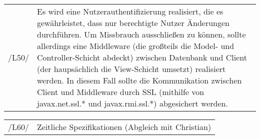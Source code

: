 \begin{tabular}{p{1.5cm}p{14.5cm}}
					
	 /L50/	& Es wird eine Nutzerauthentifizierung realisiert, die es gewährleistet, dass nur berechtigte Nutzer Änderungen durchführen. Um Missbrauch ausschließen zu können, sollte allerdings eine Middleware (die großteils die Model- und Controller-Schicht abdeckt) zwischen Datenbank und Client (der haupsächlich die View-Schicht umsetzt) realisiert werden. In diesem Fall sollte die Kommunikation zwischen Client und Middleware durch SSL (mithilfe von javax.net.ssl.* und javax.rmi.ssl.*) abgesichert werden. \\[0.25cm]
	
\end{tabular}


\begin{tabular}{p{1.5cm}p{14.5cm}}
					
	 /L60/	& Zeitliche Spezifikationen (Abgleich mit Christian) \\[0.25cm]
	
\end{tabular}



% 
